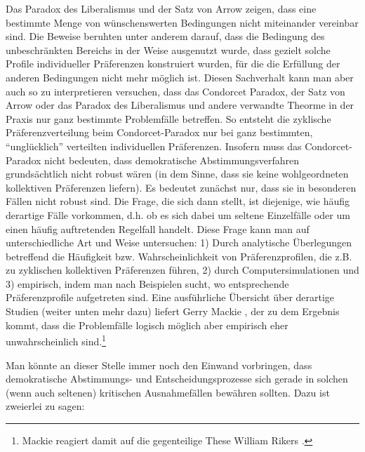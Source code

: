 Das Paradox des Liberalismus und der Satz von Arrow zeigen, dass eine bestimmte
Menge von wünschenswerten Bedingungen nicht miteinander vereinbar sind. Die
Beweise beruhten unter anderem darauf, dass die Bedingung des unbeschränkten
Bereichs in der Weise ausgenutzt wurde, dass gezielt solche Profile
individueller Präferenzen konstruiert wurden, für die die Erfüllung der anderen
Bedingungen nicht mehr möglich ist. Diesen Sachverhalt kann man aber auch so
zu interpretieren versuchen, dass das Condorcet Paradox, der Satz von Arrow
oder das Paradox des Liberalismus und andere verwandte Theorme in der Praxis
nur ganz bestimmte Problemfälle betreffen. So entsteht die zyklische
Präferenzverteilung beim Condorcet-Paradox nur bei ganz bestimmten, "`unglücklich"'
verteilten individuellen Präferenzen. Insofern muss das Condorcet-Paradox nicht
bedeuten, dass demokratische Abstimmungsverfahren grundsächtlich nicht robust
wären (in dem Sinne, dass sie keine wohlgeordneten kollektiven Präferenzen
liefern). Es bedeutet zunächst nur, dass sie in besonderen Fällen nicht robust
sind. Die Frage, die sich dann stellt, ist diejenige, wie häufig derartige
Fälle vorkommen, d.h. ob es sich dabei um seltene Einzelfälle oder um einen
häufig auftretenden Regelfall handelt. Diese Frage kann man auf
unterschiedliche Art und Weise untersuchen: 1) Durch analytische Überlegungen
betreffend die Häufigkeit bzw. Wahrscheinlichkeit von Präferenzprofilen, die
z.B. zu zyklischen kollektiven Präferenzen führen, 2) durch Computersimulationen
und 3) empirisch, indem man nach Beispielen sucht, wo entsprechende
Präferenzprofile aufgetreten sind. Eine ausführliche Übersicht über derartige
Studien (weiter unten mehr dazu) liefert Gerry Mackie \cite[S.
46ff.]{mackie:2003}, der zu dem Ergebnis kommt, dass die Problemfälle logisch
möglich aber empirisch eher unwahrscheinlich sind.\footnote{Mackie reagiert
damit auf die gegenteilige These William Rikers \cite[S. 119ff.]{riker:1982}.}

Man könnte an dieser Stelle immer noch den Einwand vorbringen, dass
demokratische Abstimmungs- und Entscheidungsprozesse sich gerade in solchen
(wenn auch seltenen) kritischen Ausnahmefällen bewähren sollten. Dazu ist
zweierlei zu sagen:

